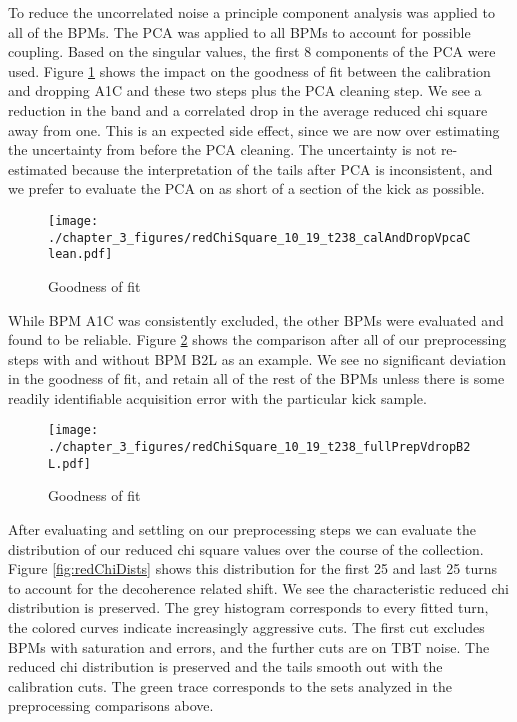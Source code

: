To reduce the uncorrelated noise a principle component analysis was applied to all of the BPMs. The PCA was applied to all BPMs to account for possible coupling. Based on the singular values, the first 8 components of the PCA were used. Figure \ref{fig:calVpca} shows the impact on the goodness of fit between the calibration and dropping A1C and these two steps plus the PCA cleaning step. We see a reduction in the band and a correlated drop in the average reduced chi square away from one. This is an expected side effect, since we are now over estimating the uncertainty from before the PCA cleaning. The uncertainty is not re-estimated because the interpretation of the tails after PCA is inconsistent, and we prefer to evaluate the PCA on as short of a section of the kick as possible.

\begin{figure}
    \centering
    \texttt{[image: ./chapter\_3\_figures/redChiSquare\_10\_19\_t238\_calAndDropVpcaClean.pdf]}
    \caption{Goodness of fit}
    \label{fig:calVpca}
\end{figure}

While BPM A1C was consistently excluded, the other BPMs were evaluated and found to be reliable. Figure \ref{fig:prepVB2L} shows the comparison after all of our preprocessing steps with and without BPM B2L as an example. We see no significant deviation in the goodness of fit, and retain all of the rest of the BPMs unless there is some readily identifiable acquisition error with the particular kick sample.

\begin{figure}
    \centering
    \texttt{[image: ./chapter\_3\_figures/redChiSquare\_10\_19\_t238\_fullPrepVdropB2L.pdf]}
    \caption{Goodness of fit}
    \label{fig:prepVB2L}
\end{figure}

After evaluating and settling on our preprocessing steps we can evaluate the distribution of our reduced chi square values over the course of the collection. Figure \ref{fig:redChiDists} shows this distribution for the first 25 and last 25 turns to account for the decoherence related shift. We see the characteristic reduced chi distribution is preserved. The grey histogram corresponds to every fitted turn, the colored curves indicate increasingly aggressive cuts. The first cut excludes BPMs with saturation and errors, and the further cuts are on TBT noise. The reduced chi distribution is preserved and the tails smooth out with the calibration cuts. The green trace corresponds to the sets analyzed in the preprocessing comparisons above.

